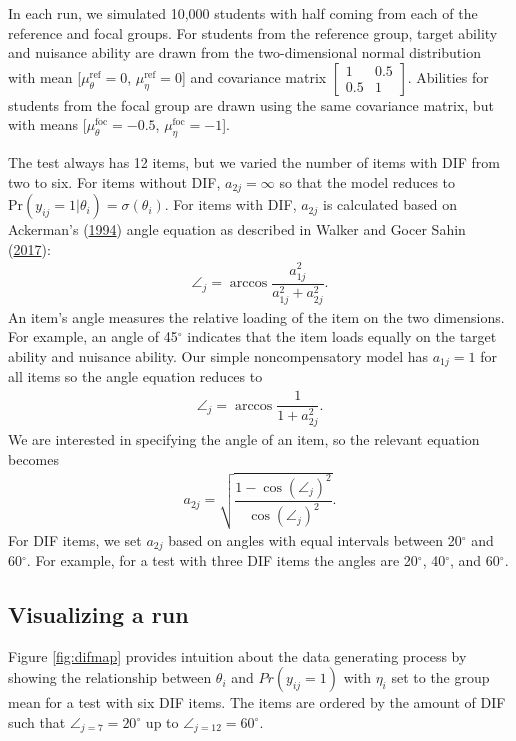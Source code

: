 \documentclass[
  11pt,
]{article}
\begin{document}
In each run, we simulated 10,000 students with half coming from each of the reference and focal groups. For students from the reference group, target ability and nuisance ability are drawn from the two-dimensional normal distribution with mean {[}\(\mu_\theta^\text{ref} = 0\), \(\mu_\eta^\text{ref} = 0\){]} and covariance matrix \(\begin{bmatrix} 1 & 0.5 \\ 0.5 & 1 \end{bmatrix}\). Abilities for students from the focal group are drawn using the same covariance matrix, but with means {[}\(\mu_\theta^\text{foc} = -0.5\), \(\mu_\eta^\text{foc} = -1\){]}.

The test always has 12 items, but we varied the number of items with DIF from two to six. For items without DIF, \(a_{2j} = \infty\) so that the model reduces to \(\text{Pr}(y_{ij} = 1 | \theta_i) = \sigma(\theta_i)\). For items with DIF, \(a_{2j}\) is calculated based on Ackerman's (\protect\hyperlink{ref-ackerman1994using}{1994}) angle equation as described in Walker and Gocer Sahin (\protect\hyperlink{ref-walker2017using}{2017}):
\begin{align}
\angle_j = \arccos \dfrac{a_{1j}^2}{a_{1j}^2 + a_{2j}^2}.
\end{align}
An item's angle measures the relative loading of the item on the two dimensions. For example, an angle of 45\(^\circ\) indicates that the item loads equally on the target ability and nuisance ability. Our simple noncompensatory model has \(a_{1j} = 1\) for all items so the angle equation reduces to
\begin{align}
\angle_j = \arccos \dfrac{1}{1 + a_{2j}^2}.
\end{align}
We are interested in specifying the angle of an item, so the relevant equation becomes
\begin{align}
a_{2j} = \sqrt{\dfrac{1 - \cos(\angle_j)^2}{\cos(\angle_j)^2}}.
\end{align}
For DIF items, we set \(a_{2j}\) based on angles with equal intervals between 20\(^\circ\) and 60\(^\circ\). For example, for a test with three DIF items the angles are 20\(^\circ\), 40\(^\circ\), and 60\(^\circ\).

\hypertarget{visualizing-a-run}{%
\subsection{Visualizing a run}\label{visualizing-a-run}}

Figure \ref{fig:difmap} provides intuition about the data generating process by showing the relationship between \(\theta_i\) and \(Pr(y_{ij} = 1)\) with \(\eta_i\) set to the group mean for a test with six DIF items. The items are ordered by the amount of DIF such that \(\angle_{j = 7} = 20^\circ\) up to \(\angle_{j = 12} = 60^\circ\).
\end{document}
